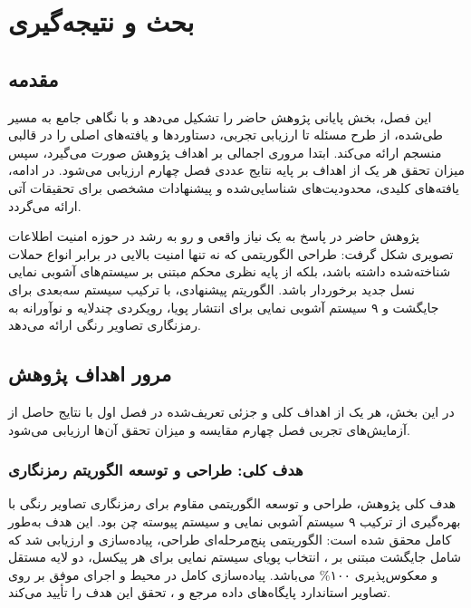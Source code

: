 
\chapter{بحث و نتیجه‌گیری}
\section{مقدمه}

این فصل، بخش پایانی پژوهش حاضر را تشکیل می‌دهد و با نگاهی جامع به مسیر طی‌شده، از طرح مسئله تا ارزیابی تجربی، دستاوردها و یافته‌های اصلی را در قالبی منسجم ارائه می‌کند. ابتدا مروری اجمالی بر اهداف پژوهش صورت می‌گیرد، سپس میزان تحقق هر یک از اهداف بر پایه نتایج عددی فصل چهارم ارزیابی می‌شود. در ادامه، یافته‌های کلیدی، محدودیت‌های شناسایی‌شده و پیشنهادات مشخصی برای تحقیقات آتی ارائه می‌گردد.

پژوهش حاضر در پاسخ به یک نیاز واقعی و رو به رشد در حوزه امنیت اطلاعات تصویری شکل گرفت: طراحی الگوریتمی که نه تنها امنیت بالایی در برابر انواع حملات شناخته‌شده داشته باشد، بلکه از پایه نظری محکم مبتنی بر سیستم‌های آشوبی نمایی نسل جدید برخوردار باشد. الگوریتم پیشنهادی، با ترکیب سیستم سه‌بعدی  برای جایگشت و ۹ سیستم آشوبی نمایی برای انتشار پویا، رویکردی چندلایه و نوآورانه به رمزنگاری تصاویر رنگی ارائه می‌دهد.

\section{مرور اهداف پژوهش}

در این بخش، هر یک از اهداف کلی و جزئی تعریف‌شده در فصل اول با نتایج حاصل از آزمایش‌های تجربی فصل چهارم مقایسه و میزان تحقق آن‌ها ارزیابی می‌شود.

\subsection{هدف کلی: طراحی و توسعه الگوریتم رمزنگاری}

هدف کلی پژوهش، طراحی و توسعه الگوریتمی مقاوم برای رمزنگاری تصاویر رنگی با بهره‌گیری از ترکیب ۹ سیستم آشوبی نمایی و سیستم پیوسته چن بود. این هدف به‌طور کامل محقق شده است: الگوریتمی پنج‌مرحله‌ای طراحی، پیاده‌سازی و ارزیابی شد که شامل جایگشت مبتنی بر ، انتخاب پویای سیستم نمایی برای هر پیکسل، دو لایه  مستقل و معکوس‌پذیری ۱۰۰\% می‌باشد. پیاده‌سازی کامل در محیط \pyver{} و اجرای موفق بر روی تصاویر استاندارد پایگاه‌های داده مرجع  و ، تحقق این هدف را تأیید می‌کند.

